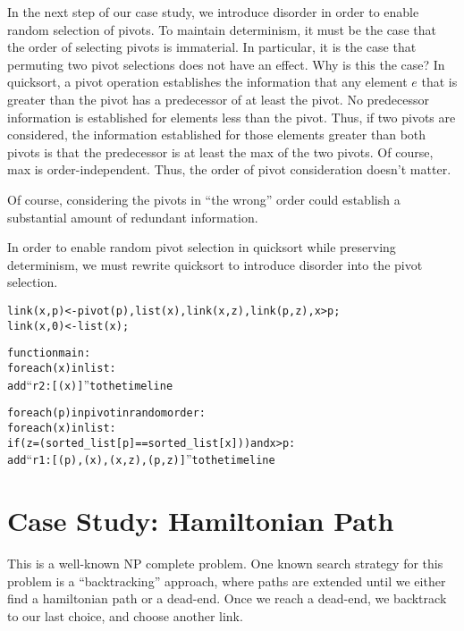 In the next step of our case study, we introduce disorder in order to enable random selection of pivots.  To maintain determinism, it must be the case that the order of selecting pivots is immaterial.  In particular, it is the case that permuting two pivot selections does not have an effect.  Why is this the case?  In quicksort, a pivot operation establishes the information that any element $e$ that is greater than the pivot has a predecessor of at least the pivot.  No predecessor information is established for elements less than the pivot.  Thus, if two pivots are considered, the information established for those elements greater than both pivots is that the predecessor is at least the max of the two pivots.  Of course, max is order-independent.  Thus, the order of pivot consideration doesn’t matter.

Of course, considering the pivots in “the wrong” order could establish a substantial amount of redundant information.

In order to enable random pivot selection in quicksort while preserving determinism, we must rewrite quicksort to introduce disorder into the pivot selection.

\begin{alltt}
link(x,p) <- pivot(p), list(x), link(x,z), link(p,z), x > p;
link(x,0) <- list(x);
\end{alltt}


\begin{alltt}
function main:
   for each (x) in list:
      add ``r2 : [(x)]'' to the timeline

   for each (p) in pivot in random order:
      for each (x) in list:
         if (z = (sorted_list[p] == sorted_list[x])) and x > p:
            add ``r1 : [(p),(x),(x,z),(p,z)]'' to the timeline
\end{alltt}

\section{Case Study: Hamiltonian Path}

This is a well-known NP complete problem.  One known search strategy for this problem is a ``backtracking'' approach, where paths are extended until we either find a hamiltonian path or a dead-end.  Once we reach a dead-end, we backtrack to our last choice, and choose another link.

